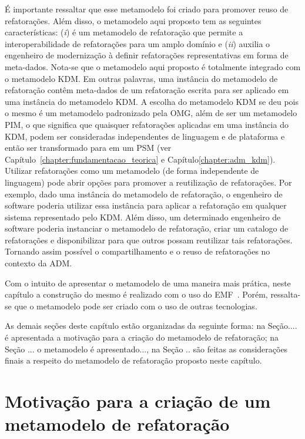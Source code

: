 É importante ressaltar que esse metamodelo foi criado para promover reuso de refatorações. Além disso, o metamodelo aqui proposto tem as seguintes características: (\textit{i}) é um metamodelo de refatoração que permite a interoperabilidade de refatorações para um amplo domínio e (\textit{ii}) auxilia o engenheiro de modernização à definir refatorações representativas em forma de meta-dados. Nota-se que o metamodelo aqui proposto é totalmente integrado com o metamodelo KDM. Em outras palavras, uma instância do metamodelo de refatoração contêm meta-dados de um refatoração escrita para ser aplicado em uma instância do metamodelo KDM. A escolha do metamodelo KDM se deu pois o mesmo é um metamodelo padronizado pela OMG, além de ser um metamodelo PIM, o que significa que quaisquer refatorações aplicadas em uma instância do KDM, podem ser consideradas independentes de linguagem e de plataforma e então ser transformado para em um PSM (ver Capítulo~\ref{chapter:fundamentacao_teorica} e Capítulo\ref{chapter:adm_kdm}). Utilizar refatorações como um metamodelo (de forma independente de linguagem) pode abrir opções para promover a reutilização de refatorações. Por exemplo, dado uma instância do metamodelo de refatoração, o engenheiro de software poderia utilizar essa instância para aplicar a refatoração em qualquer sistema representado pelo KDM. Além disso, um determinado engenheiro de software poderia instanciar o metamodelo de refatoração, criar um catalogo de refatorações e disponibilizar para que outros possam reutilizar tais refatorações. Tornando assim possível o compartilhamento e o reuso de refatorações no contexto da ADM.

Com o intuito de apresentar o metamodelo de uma maneira mais prática, neste capítulo a construção do mesmo é realizado com o uso do EMF~\cite{EMF}. Porém, ressalta-se que o metamodelo pode ser criado com o uso de outras tecnologias.

As demais seções deste capítulo estão organizadas da seguinte forma: na Seção.... é apresentada a motivação para a criação do metamodelo de refatoração; na Seção ... o metamodelo é apresentado..., na Seção .. são feitas as considerações finais a respeito do metamodelo de refatoração proposto neste capítulo.

\section{Motivação para a criação de um metamodelo de refatoração} %
\label{sec:motiva_o_para_a_cria_o_de_um_meta_modelo_de_refatora_o}

